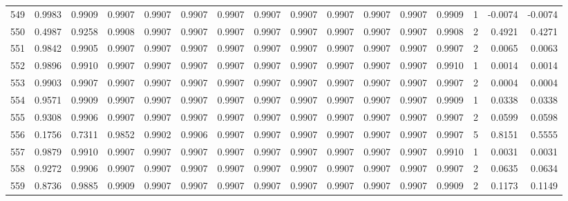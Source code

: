 \begin{tabular}{lrrrrrrrrrrrrrrr}
549 &      0.9983 &  0.9909 &  0.9907 &  0.9907 &  0.9907 &  0.9907 &  0.9907 &  0.9907 &  0.9907 &  0.9907 &   0.9907 &     0.9909 &      1 &                   -0.0074 &                    -0.0074 \\
550 &      0.4987 &  0.9258 &  0.9908 &  0.9907 &  0.9907 &  0.9907 &  0.9907 &  0.9907 &  0.9907 &  0.9907 &   0.9907 &     0.9908 &      2 &                    0.4921 &                     0.4271 \\
551 &      0.9842 &  0.9905 &  0.9907 &  0.9907 &  0.9907 &  0.9907 &  0.9907 &  0.9907 &  0.9907 &  0.9907 &   0.9907 &     0.9907 &      2 &                    0.0065 &                     0.0063 \\
552 &      0.9896 &  0.9910 &  0.9907 &  0.9907 &  0.9907 &  0.9907 &  0.9907 &  0.9907 &  0.9907 &  0.9907 &   0.9907 &     0.9910 &      1 &                    0.0014 &                     0.0014 \\
553 &      0.9903 &  0.9907 &  0.9907 &  0.9907 &  0.9907 &  0.9907 &  0.9907 &  0.9907 &  0.9907 &  0.9907 &   0.9907 &     0.9907 &      2 &                    0.0004 &                     0.0004 \\
554 &      0.9571 &  0.9909 &  0.9907 &  0.9907 &  0.9907 &  0.9907 &  0.9907 &  0.9907 &  0.9907 &  0.9907 &   0.9907 &     0.9909 &      1 &                    0.0338 &                     0.0338 \\
555 &      0.9308 &  0.9906 &  0.9907 &  0.9907 &  0.9907 &  0.9907 &  0.9907 &  0.9907 &  0.9907 &  0.9907 &   0.9907 &     0.9907 &      2 &                    0.0599 &                     0.0598 \\
556 &      0.1756 &  0.7311 &  0.9852 &  0.9902 &  0.9906 &  0.9907 &  0.9907 &  0.9907 &  0.9907 &  0.9907 &   0.9907 &     0.9907 &      5 &                    0.8151 &                     0.5555 \\
557 &      0.9879 &  0.9910 &  0.9907 &  0.9907 &  0.9907 &  0.9907 &  0.9907 &  0.9907 &  0.9907 &  0.9907 &   0.9907 &     0.9910 &      1 &                    0.0031 &                     0.0031 \\
558 &      0.9272 &  0.9906 &  0.9907 &  0.9907 &  0.9907 &  0.9907 &  0.9907 &  0.9907 &  0.9907 &  0.9907 &   0.9907 &     0.9907 &      2 &                    0.0635 &                     0.0634 \\
559 &      0.8736 &  0.9885 &  0.9909 &  0.9907 &  0.9907 &  0.9907 &  0.9907 &  0.9907 &  0.9907 &  0.9907 &   0.9907 &     0.9909 &      2 &                    0.1173 &                     0.1149 \\

\end{tabular}
